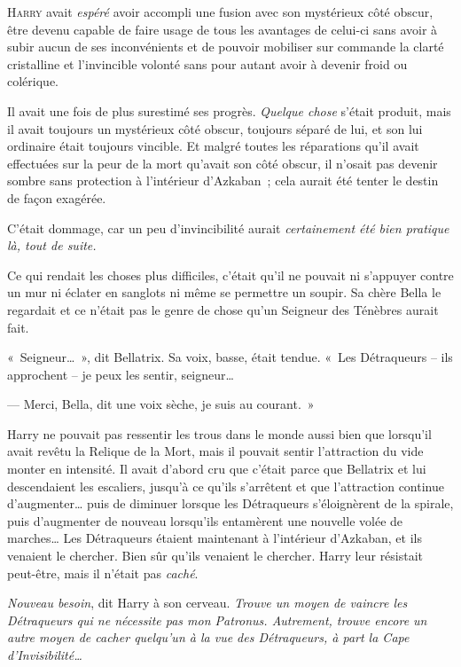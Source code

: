 
\lettrine{H}{arry} avait \emph{espéré} avoir accompli une fusion avec son mystérieux côté obscur, être devenu capable de faire usage de tous les avantages de celui-ci sans avoir à subir aucun de ses inconvénients et de pouvoir mobiliser sur commande la clarté cristalline et l'invincible volonté sans pour autant avoir à devenir froid ou colérique.

Il avait une fois de plus surestimé ses progrès. \emph{Quelque chose} s'était produit, mais il avait toujours un mystérieux côté obscur, toujours séparé de lui, et son lui ordinaire était toujours vincible. Et malgré toutes les réparations qu'il avait effectuées sur la peur de la mort qu'avait son côté obscur, il n'osait pas devenir sombre sans protection à l'intérieur d'Azkaban~; cela aurait été tenter le destin de façon exagérée.

C'était dommage, car un peu d'invincibilité aurait \emph{certainement été bien pratique là, tout de suite.}

Ce qui rendait les choses plus difficiles, c'était qu'il ne pouvait ni s'appuyer contre un mur ni éclater en sanglots ni même se permettre un soupir. Sa chère Bella le regardait et ce n'était pas le genre de chose qu'un Seigneur des Ténèbres aurait fait.

«~Seigneur…~», dit Bellatrix. Sa voix, basse, était tendue. «~Les Détraqueurs -- ils approchent -- je peux les sentir, seigneur…

--- Merci, Bella, dit une voix sèche, je suis au courant.~»

Harry ne pouvait pas ressentir les trous dans le monde aussi bien que lorsqu'il avait revêtu la Relique de la Mort, mais il pouvait sentir l'attraction du vide monter en intensité. Il avait d'abord cru que c'était parce que Bellatrix et lui descendaient les escaliers, jusqu'à ce qu'ils s'arrêtent et que l'attraction continue d'augmenter… puis de diminuer lorsque les Détraqueurs s'éloignèrent de la spirale, puis d'augmenter de nouveau lorsqu'ils entamèrent une nouvelle volée de marches… Les Détraqueurs étaient maintenant à l'intérieur d'Azkaban, et ils venaient le chercher. Bien sûr qu'ils venaient le chercher. Harry leur résistait peut-être, mais il n'était pas \emph{caché}.

\emph{Nouveau besoin}, dit Harry à son cerveau. \emph{Trouve un moyen de vaincre les Détraqueurs qui ne nécessite pas mon Patronus. Autrement, trouve encore un autre moyen de cacher quelqu'un à la vue des Détraqueurs, à part la Cape d'Invisibilité…}

